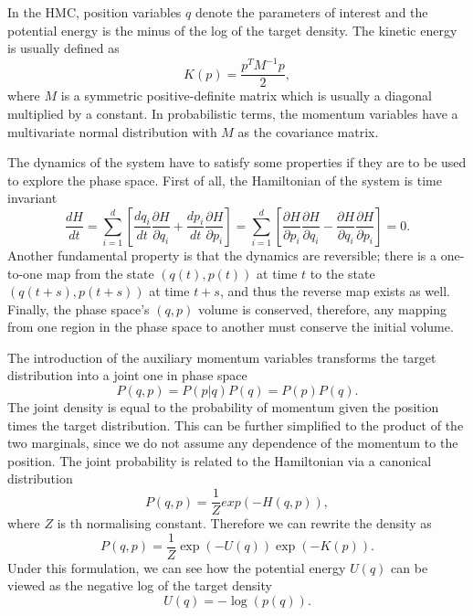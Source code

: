 In the HMC, position variables $q$ denote the parameters of interest and the potential energy is the minus of the log of the target density. The kinetic energy is usually defined as 
\begin{equation}
	K(p)= \frac{p^T M^{-1}p}{2},
\end{equation}
where $M$ is a symmetric positive-definite matrix which is usually a diagonal multiplied by a constant. In probabilistic terms, the momentum variables have a multivariate normal distribution with $M$ as the covariance matrix.

The dynamics of the system have to satisfy some properties if they are to be used to explore the phase space. First of all, the Hamiltonian of the system is time invariant 
\begin{equation}
	\frac{d H}{d t}=\sum_{i=1}^{d}\left[\frac{d q_{i}}{d t} \frac{\partial H}{\partial q_{i}}+\frac{d p_{i}}{d t} \frac{\partial H}{\partial p_{i}}\right]=\sum_{i=1}^{d}\left[\frac{\partial H}{\partial p_{i}} \frac{\partial H}{\partial q_{i}}-\frac{\partial H}{\partial q_{i}} \frac{\partial H}{\partial p_{i}}\right]=0.
\end{equation}
Another fundamental property is that the dynamics are reversible; there is a one-to-one map from the state $(q(t),p(t))$ at time $t$ to the state $(q(t+s),p(t+s))$ at time $t+s$, and thus the reverse map exists as well.
Finally, the phase space's $(q,p)$ volume is conserved, therefore, any mapping from one region in the phase space to another must conserve the initial volume. 


The introduction of the auxiliary momentum variables transforms the target distribution into a joint one in phase space 
\begin{equation}
	P(q,p) = P(p|q)P(q) = P(p)P(q).
\end{equation}
The joint density is equal to the probability of momentum given the position times the target distribution. This can be further simplified to the product of the two marginals, since we do not assume any dependence of the momentum to the position. The joint probability is related to the Hamiltonian via a canonical distribution
\begin{equation}
	P(q,p) = \frac{1}{Z}exp\left(-H(q,p)\right),
\end{equation}
where $Z$ is th normalising constant. 
Therefore we can rewrite the density as 
\begin{equation}
	P(q, p)=\frac{1}{Z} \exp \left({-U(q)}\right) \exp \left({-K(p)}\right).
\end{equation}
Under this formulation, we can see how the potential energy $U(q)$ can be viewed as the negative log of the target density 
\begin{equation}
	U(q) = -\log(p(q)).
\end{equation}

